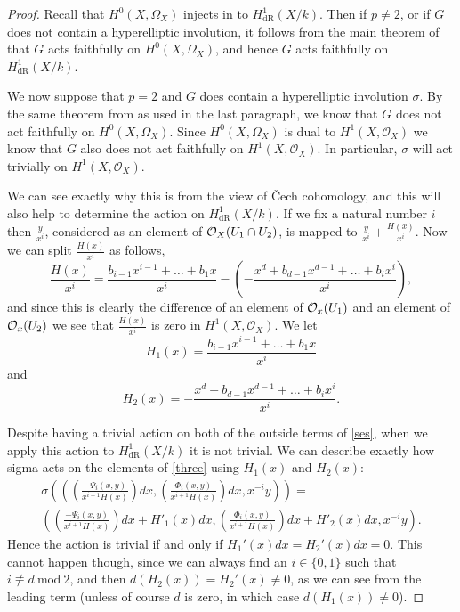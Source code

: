 \documentclass[draft, 11pt]{article} %
\theoremstyle{plain}
\theoremstyle{remark}
\newcommand{\cO}{{\cal O}}
\newcommand{\cech}{\v{C}ech }
\newcommand{\hzero}{{H^0(X,\Omega_X)}}
\newcommand{\hone}{H^1(X,\mathcal{O}_X)}
\newcommand{\derhamhone}{H_{\text {dR}}^1(X/k)}
\begin{document}
\begin{proof}
Recall that $H^0(X,\Omega_X)$ injects in to $\derhamhone$.
Then if $p \neq 2$, or if $G$ does not contain a hyperelliptic involution, it follows from the main theorem of \cite{faithfulaction} that $G$ acts faithfully on $H^0(X,\Omega_X)$, and hence $G$ acts faithfully on $\derhamhone$.

We now suppose that $p=2$ and $G$ does contain a hyperelliptic involution $\sigma$.
By the same theorem from \cite{faithfulaction} as used in the last paragraph, we know that $G$ does not act faithfully on $\hzero$.
Since $\hzero$ is dual to $\hone$ we know that $G$ also does not act faithfully on $\hone$.
In particular, $\sigma$ will act trivially on $\hone$.

We can see exactly why this is from the view of \cech cohomology, and this will also help to determine the action on $\derhamhone$.
If we fix a natural number $i$ then $\frac{y}{x^i}$, considered as an element of $\cO_X(U_1\cap U_2)$, is mapped to $\frac{y}{x^i} + \frac{H(x)}{x^i}$. 
Now we can split $\frac{H(x)}{x^i}$ as follows, 
\begin{equation*}
\frac{H(x)}{x^i} =  \frac{b_{i-1}x^{i-1} + \ldots + b_1x}{x^i} - \left( - \frac{x^d + b_{d-1}x^{d-1} + \ldots + b_ix^i}{x^i} \right),
\end{equation*}
and since this is clearly the difference of an element of $\cO_x(U_1)$ and an element of $\cO_x(U_2)$ we see that $\frac{H(x)}{x^i}$ is zero in $\hone$.
We let 
\[
H_1(x) = \frac{b_{i-1}x^{i-1} + \ldots + b_1x}{x^i}
\]
and 
\[
H_2(x) = - \frac{x^d + b_{d-1}x^{d-1} + \ldots + b_ix^i}{x^i}.
\]

Despite having a trivial action on both of the outside terms of \eqref{ses}, when we apply this action to $\derhamhone$ it is not trivial. 
We can describe exactly how sigma acts on the elements of \eqref{three} using $H_1(x)$ and $H_2(x)$:
\begin{multline}
\sigma \left( \left( \left(\frac{-\Psi_i(x,y)}{x^{i+1}H(x)}\right) dx, \left( \frac{\Phi_i(x,y)}{x^{i+1}H(x)} \right) dx, x^{-i}y \right)\right) = \\
 \left( \left(\frac{-\Psi_i(x,y)}{x^{i+1}H(x)} \right) dx + H'_1(x)dx,  \left( \frac{\Phi_i(x,y)}{x^{i+1}H(x)} \right) dx+ H'_2(x)dx, x^{-i}y \right).
\end{multline}
Hence the action is trivial if and only if $H_1'(x)dx = H_2'(x)dx =0$.
This cannot happen though, since we can always find an $i\in \{0,1\}$ such that $i \not\equiv d\ \text{mod}\ 2$, and then $d\left(H_2(x)\right) = H_2'(x) \neq 0$, as we can see from the leading term (unless of course $d$ is zero, in which case $d\left(H_1(x)\right) \neq 0$).
\end{proof}
\end{document}
